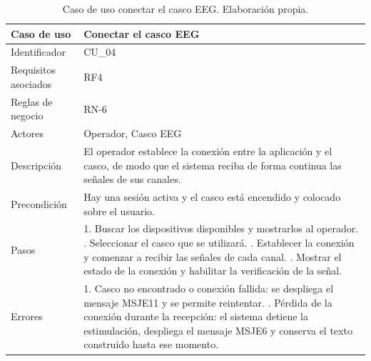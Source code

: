 \begin{table}[H]
\centering
\small
\begin{tabularx}{\textwidth}{|L{3.0cm}|Y|}
\hline
\textbf{Caso de uso} & \textbf{Conectar el casco EEG} \\
\hline
Identificador & CU\_04 \\
\hline
Requisitos asociados & RF4 \\
\hline
Reglas de negocio & RN-6 \\
\hline
Actores & Operador, Casco EEG \\
\hline
Descripción & El operador establece la conexión entre la aplicación y el casco, de modo que el sistema reciba de forma continua las señales de sus canales. \\
\hline
Precondición & Hay una sesión activa y el casco está encendido y colocado sobre el usuario. \\
\hline
Pasos & 1. Buscar los dispositivos disponibles y mostrarlos al operador. . Seleccionar el casco que se utilizará. . Establecer la conexión y comenzar a recibir las señales de cada canal. . Mostrar el estado de la conexión y habilitar la verificación de la señal. \\
\hline
Errores & 1. Casco no encontrado o conexión fallida: se despliega el mensaje MSJE11 y se permite reintentar. . Pérdida de la conexión durante la recepción: el sistema detiene la estimulación, despliega el mensaje MSJE6 y conserva el texto construido hasta ese momento. \\
\hline
\end{tabularx}
\caption{Caso de uso conectar el casco EEG. Elaboración propia.}
\label{tab:cu04}
\end{table}

